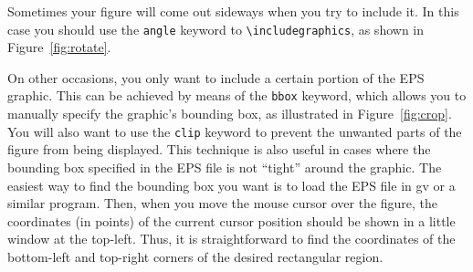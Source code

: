 \documentclass[proceedings, preprint]{rmaa}
\newcommand{\CS}[1]{\texttt{\textbackslash #1}}
\begin{document}
Sometimes your figure will come out sideways when you try to include
it. In this case you should use the \texttt{angle} keyword to
\CS{includegraphics}, as shown in Figure~\ref{fig:rotate}. 

On other occasions, you only want to include a certain portion of the
EPS graphic. This can be achieved by means of the \texttt{bbox}
keyword, which allows you to manually specify the graphic's bounding
box, as illustrated in Figure~\ref{fig:crop}. You will also want to
use the \texttt{clip} keyword to prevent the unwanted parts of the
figure from being displayed. This technique is also useful in cases
where the bounding box specified in the EPS file is not ``tight''
around the graphic. The easiest way to find the bounding box you want
is to load the EPS file in gv or a similar program. Then, when you
move the mouse cursor over the figure, the coordinates (in points) of
the current cursor position should be shown in a little window at the
top-left. Thus, it is straightforward to find the coordinates of the
bottom-left and top-right corners of the desired rectangular region.


\end{document}
